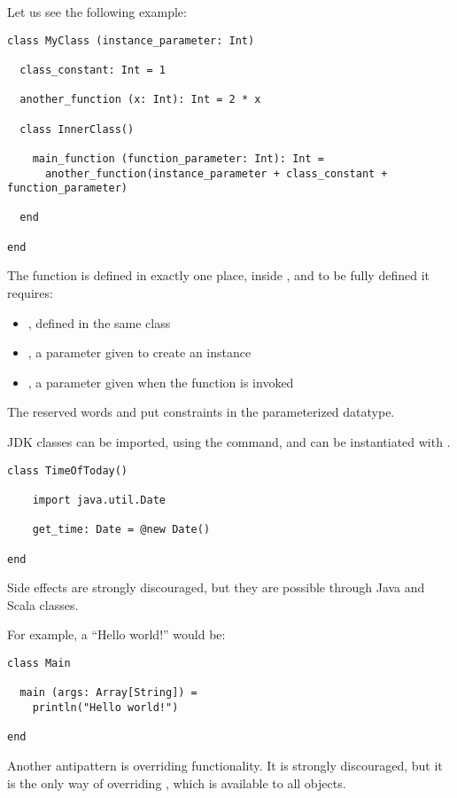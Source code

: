 Let us see the following example:
\begin{lstlisting}[label={lst:exampleExplicitDefinition}]
class MyClass (instance_parameter: Int)

  class_constant: Int = 1

  another_function (x: Int): Int = 2 * x

  class InnerClass()

    main_function (function_parameter: Int): Int =
      another_function(instance_parameter + class_constant + function_parameter)

  end

end
\end{lstlisting}

The function  is defined in exactly one place, inside , and to be fully defined it requires:
\begin{itemize}
    \item {}, defined in the same class
    \item {}, a parameter given to create an instance
    \item {}, a parameter given when the function is invoked
\end{itemize}

The reserved words \sodasubtype and \sodasupertype put constraints in the parameterized datatype.

JDK classes can be imported, using the \sodaimport command, and can be instantiated with \sodanew.

\begin{lstlisting}[label={lst:exampleJDKImport}]
class TimeOfToday()

    import java.util.Date

    get_time: Date = @new Date()

end
\end{lstlisting}

Side effects are strongly discouraged, but they are possible through Java and Scala classes.

For example, a ``Hello world!'' would be:
\begin{lstlisting}[label={lst:exampleHelloWorld}]
class Main

  main (args: Array[String]) =
    println("Hello world!")

end
\end{lstlisting}

Another antipattern is overriding functionality.
It is strongly discouraged, but it is the only way of overriding , which is available to all objects.

